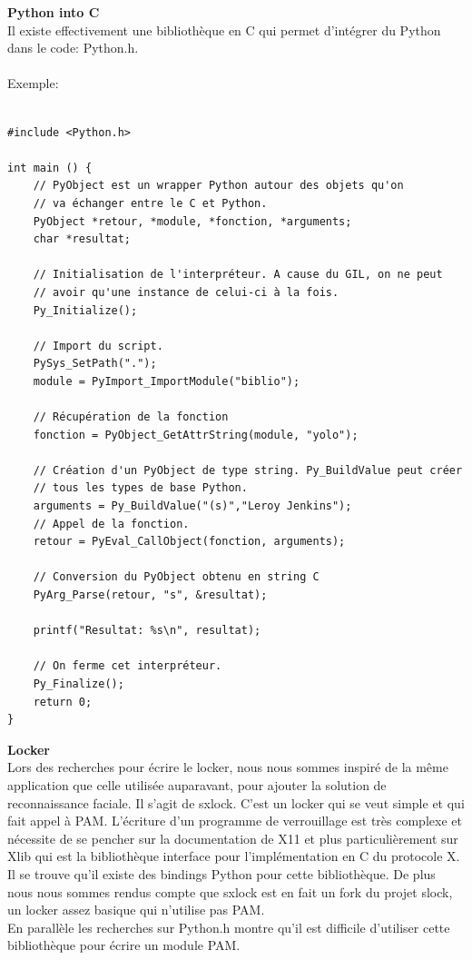 \documentclass[french]{report}
\begin{document}
  \vspace{0.5cm}

  \textbf{Python into C}\\

  Il existe effectivement une bibliothèque en C qui permet d’intégrer du
  Python dans le code: Python.h.
\\ \\
  Exemple:

  \begin{verbatim}

#include <Python.h>

int main () {
    // PyObject est un wrapper Python autour des objets qu'on
    // va échanger entre le C et Python.
    PyObject *retour, *module, *fonction, *arguments;
    char *resultat;

    // Initialisation de l'interpréteur. A cause du GIL, on ne peut
    // avoir qu'une instance de celui-ci à la fois.
    Py_Initialize();

    // Import du script.
    PySys_SetPath(".");
    module = PyImport_ImportModule("biblio");

    // Récupération de la fonction
    fonction = PyObject_GetAttrString(module, "yolo");

    // Création d'un PyObject de type string. Py_BuildValue peut créer
    // tous les types de base Python.
    arguments = Py_BuildValue("(s)","Leroy Jenkins");
    // Appel de la fonction.
    retour = PyEval_CallObject(fonction, arguments);

    // Conversion du PyObject obtenu en string C
    PyArg_Parse(retour, "s", &resultat);

    printf("Resultat: %s\n", resultat);

    // On ferme cet interpréteur.
    Py_Finalize();
    return 0;
}
  \end{verbatim}

  \vspace{0.5cm}

  \textbf{Locker}\\

  Lors des recherches pour écrire le locker, nous nous sommes inspiré de la même
  application que celle utilisée auparavant, pour ajouter la solution de
  reconnaissance faciale. Il s’agit de sxlock. C’est un locker qui se
  veut simple et qui fait appel à PAM. L’écriture d’un programme de
  verrouillage est très complexe et nécessite de se pencher sur la
  documentation de X11 et plus particulièrement sur Xlib qui est la
  bibliothèque interface pour l’implémentation en C du protocole X. Il se
  trouve qu’il existe des bindings Python pour cette bibliothèque. De plus nous
  nous sommes rendus compte que sxlock est en fait un fork du projet slock, un
  locker assez basique qui n’utilise pas PAM.
\\
  En parallèle les recherches sur Python.h montre qu’il est difficile
  d’utiliser cette bibliothèque pour écrire un module PAM.
\end{document}
